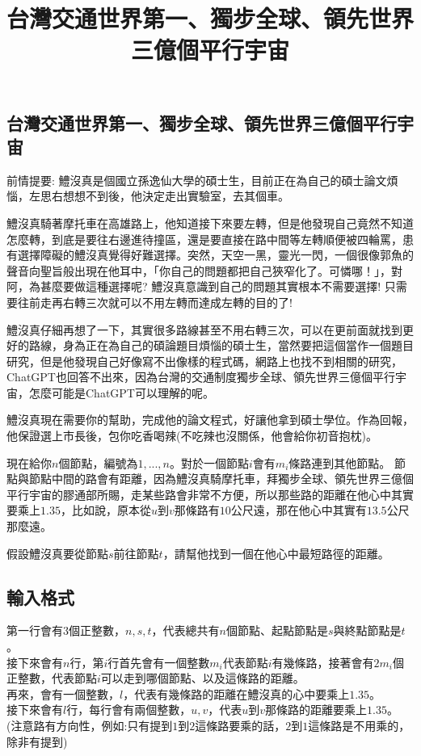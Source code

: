 \documentclass{article}
\title{台灣交通世界第一、獨步全球、領先世界三億個平行宇宙}
\begin{document}
\begin{CJK*}{UTF8}{bsmi}

\maketitle

\section*{台灣交通世界第一、獨步全球、領先世界三億個平行宇宙}

前情提要: 鱧沒真是個國立孫逸仙大學的碩士生，目前正在為自己的碩士論文煩惱，左思右想想不到後，他決定走出實驗室，去其個車。

鱧沒真騎著摩托車在高雄路上，他知道接下來要左轉，但是他發現自己竟然不知道怎麼轉，到底是要往右邊進待撞區，還是要直接在路中間等左轉順便被四輪罵，患有選擇障礙的鱧沒真覺得好難選擇。突然，天空一黑，靈光一閃，一個很像郭魚的聲音向聖旨般出現在他耳中，「你自己的問題都把自己狹窄化了。可憐哪！」，對阿，為甚麼要做這種選擇呢? 鱧沒真意識到自己的問題其實根本不需要選擇! 只需要往前走再右轉三次就可以不用左轉而達成左轉的目的了!

鱧沒真仔細再想了一下，其實很多路線甚至不用右轉三次，可以在更前面就找到更好的路線，身為正在為自己的碩論題目煩惱的碩士生，當然要把這個當作一個題目研究，但是他發現自己好像寫不出像樣的程式碼，網路上也找不到相關的研究，ChatGPT也回答不出來，因為台灣的交通制度獨步全球、領先世界三億個平行宇宙，怎麼可能是ChatGPT可以理解的呢。

鱧沒真現在需要你的幫助，完成他的論文程式，好讓他拿到碩士學位。作為回報，他保證選上市長後，包你吃香喝辣(不吃辣也沒關係，他會給你初音抱枕)。

現在給你$n$個節點，編號為$1,...,n$。對於一個節點$i$會有$m_i$條路連到其他節點。
節點與節點中間的路會有距離，因為鱧沒真騎摩托車，拜獨步全球、領先世界三億個平行宇宙的膠通部所賜，走某些路會非常不方便，所以那些路的距離在他心中其實要乘上$1.35$，比如說，原本從$u$到$v$那條路有$10$公尺遠，那在他心中其實有$13.5$公尺那麼遠。

假設鱧沒真要從節點$s$前往節點$t$，請幫他找到一個在他心中最短路徑的距離。

\subsection*{輸入格式}
第一行會有$3$個正整數，$n,s,t$，代表總共有$n$個節點、起點節點是$s$與終點節點是$t$。\\
接下來會有$n$行，第$i$行首先會有一個整數$m_i$代表節點$i$有幾條路，接著會有$2m_i$個正整數，代表節點$i$可以走到哪個節點、以及這條路的距離。\\
再來，會有一個整數，$l$，代表有幾條路的距離在鱧沒真的心中要乘上$1.35$。\\
接下來會有$l$行，每行會有兩個整數，$u,v$，代表$u$到$v$那條路的距離要乘上$1.35$。(注意路有方向性，例如:只有提到$1$到$2$這條路要乘的話，$2$到$1$這條路是不用乘的，除非有提到)


\end{CJK*}
\end{document}
